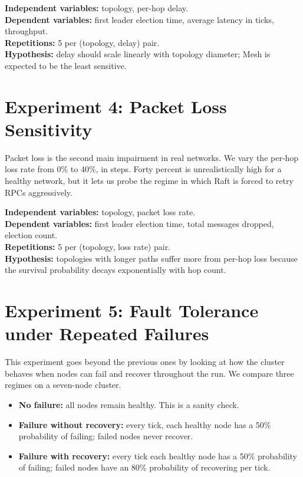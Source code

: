 \textbf{Independent variables:} topology, per-hop delay.\\
\textbf{Dependent variables:} first leader election time, average latency in ticks, throughput.\\
\textbf{Repetitions:} 5 per (topology, delay) pair.\\
\textbf{Hypothesis:} delay should scale linearly with topology diameter; Mesh is expected to be the least sensitive.

\section{Experiment 4: Packet Loss Sensitivity}
\label{sec:exp4}

Packet loss is the second main impairment in real networks. We vary the per-hop loss rate from 0\% to 40\%, in steps. Forty percent is unrealistically high for a healthy network, but it lets us probe the regime in which Raft is forced to retry RPCs aggressively.

\textbf{Independent variables:} topology, packet loss rate.\\
\textbf{Dependent variables:} first leader election time, total messages dropped, election count.\\
\textbf{Repetitions:} 5 per (topology, loss rate) pair.\\
\textbf{Hypothesis:} topologies with longer paths suffer more from per-hop loss because the survival probability decays exponentially with hop count.

\section{Experiment 5: Fault Tolerance under Repeated Failures}
\label{sec:exp5}

This experiment goes beyond the previous ones by looking at how the cluster behaves when nodes can fail and recover throughout the run. We compare three regimes on a seven-node cluster.

\begin{itemize}
    \item \textbf{No failure:} all nodes remain healthy. This is a sanity check.
    \item \textbf{Failure without recovery:} every tick, each healthy node has a 50\% probability of failing; failed nodes never recover.
    \item \textbf{Failure with recovery:} every tick each healthy node has a 50\% probability of failing; failed nodes have an 80\% probability of recovering per tick.
\end{itemize}


